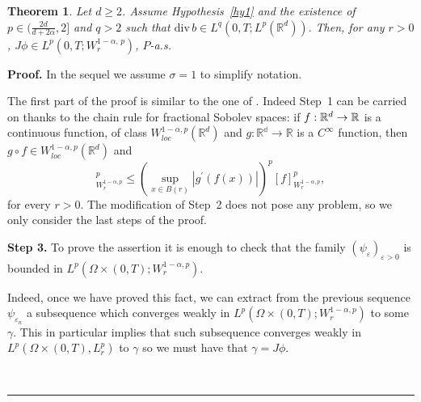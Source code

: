 \documentclass{article}
\newtheorem{theorem}{Theorem}
\newenvironment{proof}[1][Proof]{\noindent\textbf{#1.} }{\ \rule{0.5em}{0.5em}}
\begin{document}
\begin{theorem}
\label{iac11} Let $d\ge 2$. Assume  Hypothesis~\ref{hy1}  and  the
existence of  $p\in (\frac{2d}{ d + 2 \alpha},2]$ and $q>2$ such
that $
 {\mathrm{div}\,}b\in L^{q} (0,T;L^{p}(\mathbb{R}^{d})) .
$ Then,
 for any
 $r>0$,
 $
  J\phi \in
 L^{p}( 0,T;W_{r}^{1 - \alpha, \, p} )$, $P$-a.s.
\end{theorem}
\begin{proof}  In the sequel we assume $\sigma =1$
 to simplify notation.

 The first part of the proof is similar to
 the one of \cite[Theorem 11]{FGP}.
  Indeed Step~1 can be carried on thanks to the  chain rule for fractional Sobolev
 spaces:
 if $f:\mathbb{R}^{d}\rightarrow \mathbb{%
R}$ is a continuous function, of class $W_{loc}^{1-\alpha,p}(\mathbb{R}^{d})$ and $%
g:\mathbb{R^d}\rightarrow \mathbb{R}$ is a $C^{\infty }$ function,
then $ g\circ f\in W_{loc}^{1-\alpha,p}(\mathbb{R}^{d})$  and
\begin{equation*}
 [ (g\circ f)]^p_{W_{r}^{1- \alpha, p}}
 \leq \left( \sup_{x\in B(r)}\left|
g^{\prime }(f(x))\right| \right) ^{p} [  f]^p_{W_{r}^{1- \alpha,
p}},
\end{equation*}
for every $r>0$. The modification of Step~2 does not pose any
problem, so we only consider the last steps of the proof.

\medskip \textbf{Step 3.} To prove the assertion it is enough
 to check that the family $\left(
\psi _{\varepsilon }\right) _{\varepsilon >0}$ is bounded in
 $L^{p}(\Omega \times (0,T);W_{r}^{1-\alpha,p})$.

Indeed, once we have proved this fact, we can extract from
 the previous
sequence
 $\psi _{\varepsilon _{n}}$ a subsequence which converges
  weakly in $L^{p}(\Omega
\times (0,T);W_{r}^{1-\alpha,p})$ to some $\gamma $. This in
particular implies that such subsequence  converges weakly in
$L^{p}(\Omega \times (0,T),L_{r}^{p})$ to  $\gamma $ so we must have
that $\gamma = J \phi$.


\end{proof}
\end{document}
